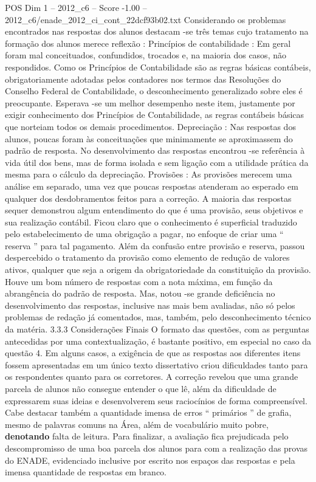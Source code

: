 \begin{textsample}{POS Dim 1 – 2012\_c6 – Score -1.00 – 2012\_c6/enade\_2012\_ci\_cont\_22dcf93b02.txt}
Considerando os problemas encontrados nas respostas dos alunos destacam -se três temas cujo tratamento na formação dos alunos merece reflexão : Princípios de contabilidade : Em geral foram mal conceituados, confundidos, trocados e, na maioria dos casos, não respondidos.
Como os Princípios de Contabilidade são as regras básicas contábeis, obrigatoriamente adotadas pelos contadores nos termos das Resoluções do Conselho Federal de Contabilidade, o desconhecimento generalizado sobre eles é preocupante.
Esperava -se um melhor desempenho neste item, justamente por exigir conhecimento dos Princípios de Contabilidade, as regras contábeis básicas que norteiam todos os demais procedimentos.
Depreciação : Nas respostas dos alunos, poucas foram às conceituações que minimamente se aproximassem do padrão de resposta.
No desenvolvimento das respostas encontrou -se referência à vida útil dos bens, mas de forma isolada e sem ligação com a utilidade prática da mesma para o cálculo da depreciação.
Provisões : As provisões merecem uma análise em separado, uma vez que poucas respostas atenderam ao esperado em qualquer dos desdobramentos feitos para a correção.
A maioria das respostas sequer demonstrou algum entendimento do que é uma provisão, seus objetivos e sua realização contábil.
Ficou claro que o conhecimento é superficial traduzido pelo estabelecimento de uma obrigação a pagar, no enfoque de criar uma “ reserva ” para tal pagamento.
Além da confusão entre provisão e reserva, passou despercebido o tratamento da provisão como elemento de redução de valores ativos, qualquer que seja a origem da obrigatoriedade da constituição da provisão.
Houve um bom número de respostas com a nota máxima, em função da abrangência do padrão de resposta.
Mas, notou -se grande deficiência no desenvolvimento das respostas, inclusive nas mais bem avaliadas, não só pelos problemas de redação já comentados, mas, também, pelo desconhecimento técnico da matéria. 3.3.3 Considerações Finais O formato das questões, com as perguntas antecedidas por uma contextualização, é bastante positivo, em especial no caso da questão 4.
Em alguns casos, a exigência de que as respostas aos diferentes itens fossem apresentadas em um único texto dissertativo criou dificuldades tanto para os respondentes quanto para os corretores.
A correção revelou que uma grande parcela de alunos não consegue entender o que lê, além da dificuldade de expressarem suas ideias e desenvolverem seus raciocínios de forma compreensível.
Cabe destacar também a quantidade imensa de erros “ primários ” de grafia, mesmo de palavras comuns na Área, além de vocabulário muito pobre, \textbf{denotando} falta de leitura.
Para finalizar, a avaliação fica prejudicada pelo descompromisso de uma boa parcela dos alunos para com a realização das provas do ENADE, evidenciado inclusive por escrito nos espaços das respostas e pela imensa quantidade de respostas em branco.

\end{textsample}
